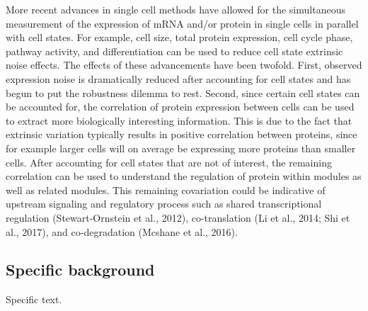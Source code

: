 More recent advances in single cell methods have allowed for the simultaneous measurement of the expression of mRNA and/or protein in single cells in parallel with cell states. For example, cell size, total protein expression, cell cycle phase, pathway activity, and differentiation can be used to reduce cell state extrinsic noise effects. The effects of these advancements have been twofold. First, observed expression noise is dramatically reduced after accounting for cell states and has begun to put the robustness dilemma to rest. Second, since certain cell states can be accounted for, the correlation of protein expression between cells can be used to extract more biologically interesting information. This is due to the fact that extrinsic variation typically results in positive correlation between proteins, since for example larger cells will on average be expressing more proteins than smaller cells. After accounting for cell states that are not of interest, the remaining correlation can be used to understand the regulation of protein within modules as well as related modules. This remaining covariation could be indicative of upstream signaling and regulatory process such as shared transcriptional regulation (Stewart-Ornstein et al., 2012), co-translation (Li et al., 2014; Shi et al., 2017), and co-degradation (Mcshane et al., 2016). 


\subsection{Specific background}
Specific text.
